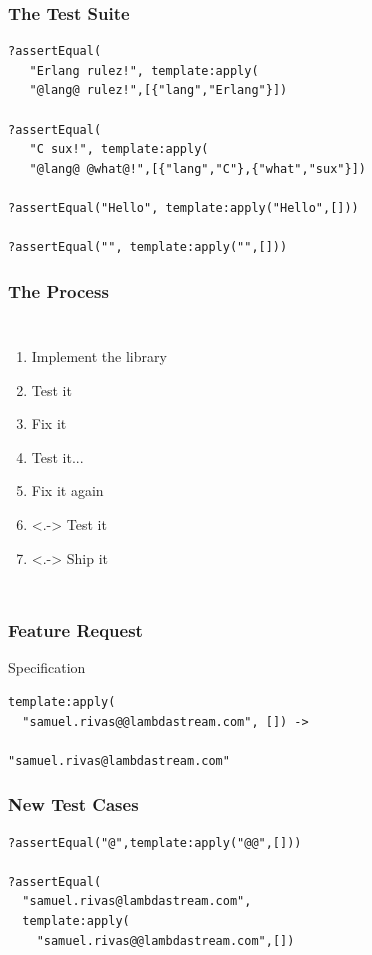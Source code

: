 \documentclass[xcolor=dvipsnames]{beamer}
\begin{document}
\begin{frame}[fragile]
  \frametitle{The Test Suite}

\begin{verbatim}
?assertEqual(
   "Erlang rulez!", template:apply(
   "@lang@ rulez!",[{"lang","Erlang"}])

?assertEqual(
   "C sux!", template:apply(
   "@lang@ @what@!",[{"lang","C"},{"what","sux"}])

?assertEqual("Hello", template:apply("Hello",[]))

?assertEqual("", template:apply("",[]))
\end{verbatim}
\end{frame}

\begin{frame}
  \frametitle{The Process}
  \begin{center}
    \begin{columns}
      \begin{enumerate}
      \item Implement the library
      \item Test it
      \item Fix it
      \item<+-> Test it...
      \item<+-> Fix it again
      \item<.-> Test it
      \item<.-> Ship it
      \end{enumerate}
      \onslide<+->{%
        {\huge \textbf{\euro\euro\euro} !!}
      }
    \end{columns}
  \end{center}
\end{frame}

\begin{frame}[fragile]
  \frametitle{Feature Request}

  \begin{block}{Specification}%
\begin{verbatim}
template:apply(
  "samuel.rivas@@lambdastream.com", []) ->

"samuel.rivas@lambdastream.com"
\end{verbatim}
  \end{block}
\end{frame}

\begin{frame}[fragile]
  \frametitle{New Test Cases}

\begin{verbatim}
?assertEqual("@",template:apply("@@",[]))

?assertEqual(
  "samuel.rivas@lambdastream.com",
  template:apply(
    "samuel.rivas@@lambdastream.com",[])
\end{verbatim}
\end{frame}
\end{document}
